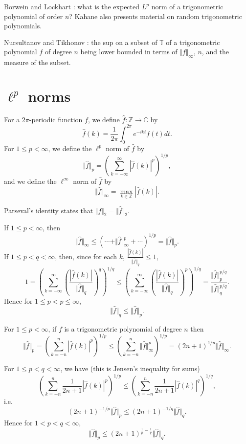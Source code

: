 \documentclass{article}
\newcommand{\norm}[1]{\Vert #1 \Vert}
\theoremstyle{definition}
\begin{document}
Borwein and Lockhart \cite{MR1814174}: what is the expected $L^p$ norm of a trigonometric polynomial of order $n$?
Kahane \cite[Chapter~6]{kahane} also presents material on random trigonometric polynomials. 







Nursultanov and Tikhonov \cite{MR3078275}: the sup on a subset of $\mathbb{T}$ of a trigonometric polynomial $f$ of degree $n$  being lower
bounded in terms of $\norm{f}_\infty$, $n$,  and the measure of the subset. 

\section{$\ell^p$ norms}
For a $2\pi$-periodic function $f$, we define $\hat{f}:\mathbb{Z} \to \mathbb{C}$ by
\[
\hat{f}(k)=\frac{1}{2\pi} \int_0^{2\pi} e^{-ikt} f(t) dt.
\]
For $1 \leq p < \infty$, we define the $\ell^p$ norm of $\hat{f}$ by 
\[
\norm{\hat{f}}_p=\left( \sum_{k=-\infty}^\infty |\hat{f}(k)|^p \right)^{1/p},
\]
and we define the $\ell^\infty$ norm of $\hat{f}$ by 
\[
\norm{\hat{f}}_\infty=\max_{k \in \mathbb{Z}} |\hat{f}(k)|.
\]

Parseval's identity \cite[p.~80, Theorem~1.3]{steinI} states that $\norm{f}_2=\norm{\hat{f}}_2$.




If $1 \leq p < \infty$, then
\[
\norm{\hat{f}}_\infty \leq \left( \cdots+\norm{\hat{f}}_\infty^p + \cdots \right)^{1/p}= \norm{\hat{f}}_p.
\]
If $1 \leq p < q < \infty$, then, since for each $k$, $\frac{|\hat{f}(k)|}{\norm{\hat{f}}_q} \leq 1$,
\[
1=\left( \sum_{k=-\infty}^\infty \left( \frac{|\hat{f}(k)|}{\norm{\hat{f}}_q} \right)^q \right)^{1/q} \leq
\left( \sum_{k=-\infty}^\infty \left( \frac{|\hat{f}(k)|}{\norm{\hat{f}}_q} \right)^p \right)^{1/q} 
=\frac{\norm{\hat{f}}_p^{p/q}}{\norm{\hat{f}}_q^{p/q}}.
\]
Hence for $1 \leq p < p \leq \infty$,
\[
\norm{\hat{f}}_q \leq \norm{\hat{f}}_p.
\]

For $1 \leq p < \infty$, if $f$ is a trigonometric polynomial of degree $n$ then 
\[
\norm{\hat{f}}_p 
=\left( \sum_{k=-n}^n |\hat{f}(k)|^p \right)^{1/p} \leq \left( \sum_{k=-n}^n \norm{\hat{f}}_\infty^p \right)^{1/p}
=(2n+1)^{1/p} \norm{\hat{f}}_\infty.
\]

For $1 \leq p < q < \infty$, we have \cite[p.~123, Problem~8.3]{master} (this is  Jensen's inequality for sums)
\[
\left( \sum_{k=-n}^n \frac{1}{2n+1} |\hat{f}(k)|^p \right)^{1/p} \leq \left( \sum_{k=-n}^n \frac{1}{2n+1} |\hat{f}(k)|^q \right)^{1/q},
\]
i.e.
\[
(2n+1)^{-1/p}  \norm{\hat{f}}_p \leq (2n+1)^{-1/q} \norm{\hat{f}}_q.
\]
Hence for $1 < p < q < \infty$,
\[
\norm{\hat{f}}_p \leq (2n+1)^{\frac{1}{p}-\frac{1}{q}} \norm{\hat{f}}_q.
\]
\end{document}

